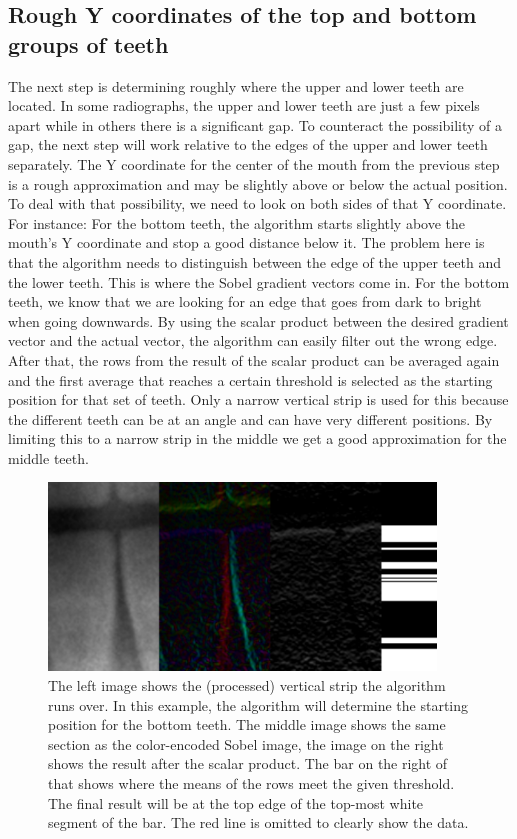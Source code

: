 \documentclass[a4paper,10pt]{article}
\begin{document}
\subsection{Rough Y coordinates of the top and bottom groups of teeth} 
The next step is determining roughly where the upper and lower teeth are located. In some radiographs, the upper and lower teeth are just a few pixels apart while in others there is a significant gap. To counteract the possibility of a gap, the next step will work relative to the edges of the upper and lower teeth separately. The Y coordinate for the center of the mouth from the previous step is a rough approximation and may be slightly above or below the actual position. To deal with that possibility, we need to look on both sides of that Y coordinate. For instance: For the bottom teeth, the algorithm starts slightly above the mouth's Y coordinate and stop a good distance below it. The problem here is that the algorithm needs to distinguish between the edge of the upper teeth and the lower teeth. This is where the Sobel gradient vectors come in. For the bottom teeth, we know that we are looking for an edge that goes from dark to bright when going downwards. By using the scalar product between the desired gradient vector and the actual vector, the algorithm can easily filter out the wrong edge. After that, the rows from the result of the scalar product can be averaged again and the first average that reaches a certain threshold is selected as the starting position for that set of teeth. Only a narrow vertical strip is used for this because the different teeth can be at an angle and can have very different positions. By limiting this to a narrow strip in the middle we get a good approximation for the middle teeth.
\begin{figure}[h]
\centering
\includegraphics[height=50mm]{teeth_vertical.png}
 \caption{The left image shows the (processed) vertical strip the algorithm runs over. In this example, the algorithm will determine the starting position for the bottom teeth. The middle image shows the same section as the color-encoded Sobel image, the image on the right shows the result after the scalar product. The bar on the right of that shows where the means of the rows meet the given threshold. The final result will be at the top edge of the top-most white segment of the bar. The red line is omitted to clearly show the data.}
\end{figure}
\end{document}
